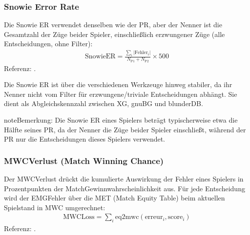 \documentclass[letterpaper,10pt,german]{sphinxmanual}
\begin{document}
\subsubsection{Snowie Error Rate}
\label{\detokenize{stats_parity:snowie-error-rate}}
\sphinxAtStartPar
Die Snowie ER verwendet denselben  wie der PR, aber der Nenner ist die Gesamtzahl der Züge beider Spieler, einschließlich erzwungener Züge (alle Entscheidungen, ohne Filter):
\begin{equation*}
\begin{split}\mathrm{SnowieER} = \frac{\sum_i |\mathrm{Fehler}_i|}{N_\text{P1} + N_\text{P2}} \times 500\end{split}
\end{equation*}
\sphinxAtStartPar
Referenz: .

\sphinxAtStartPar
Die Snowie ER ist über die verschiedenen Werkzeuge hinweg stabiler, da ihr Nenner nicht vom Filter für erzwungene/triviale Entscheidungen abhängt. Sie dient als Abgleichskennzahl zwischen XG, gnuBG und blunderDB.

\begin{sphinxadmonition}{note}{Bemerkung:}
\sphinxAtStartPar
Die Snowie ER eines Spielers beträgt typischerweise etwa die Hälfte seines PR, da der Nenner die Züge beider Spieler einschließt, während der PR nur die Entscheidungen dieses Spielers verwendet.
\end{sphinxadmonition}


\subsubsection{MWC\sphinxhyphen{}Verlust (Match Winning Chance)}
\label{\detokenize{stats_parity:perte-mwc-match-winning-chance}}
\sphinxAtStartPar
Der MWC\sphinxhyphen{}Verlust drückt die kumulierte Auswirkung der Fehler eines Spielers in Prozentpunkten der Match\sphinxhyphen{}Gewinnwahrscheinlichkeit aus. Für jede Entscheidung wird der EMG\sphinxhyphen{}Fehler über die MET (Match Equity Table) beim aktuellen Spielstand in MWC umgerechnet:
\begin{equation*}
\begin{split}\mathrm{MWCLoss} = \sum_i \mathrm{eq2mwc}(\mathrm{erreur}_i, \mathrm{score}_i)\end{split}
\end{equation*}
\sphinxAtStartPar
Referenz: .
\end{document}
